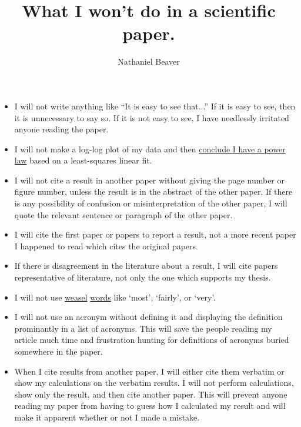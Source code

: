 \documentclass[12pt,letterpaper]{article}
\author{Nathaniel Beaver}
\title{What I won't do in a scientific paper.}
\begin{document}
\maketitle

\begin{itemize}
\item I will not write anything like ``It is easy to see that...'' If it is easy to see, then it is unnecessary to say so. If it is not easy to see, I have needlessly irritated anyone reading the paper.
\item I will not make a log-log plot of my data and then \href{http://vserver1.cscs.lsa.umich.edu/~crshalizi/notebooks/power-laws.html}{conclude I have a power law} based on a least-squares linear fit. 
\item I will not cite a result in another paper without giving the page number or figure number, unless the result is in the abstract of the other paper. If there is any possibility of confusion or misinterpretation of the other paper, I will quote the relevant sentence or paragraph of the other paper.
\item I will cite the first paper or papers to report a result, not a more recent paper I happened to read which cites the original papers.
\item If there is disagreement in the literature about a result, I will cite papers representative of literature, not only the one which supports my thesis.
\item I will not use \href{http://matt.might.net/articles/shell-scripts-for-passive-voice-weasel-words-duplicates/}{weasel} \href{http://en.wikipedia.org/wiki/Weasel_words}{words} like `most', `fairly', or `very'.
\item I will not use an acronym without defining it and displaying the definition prominantly in a list of acronyms. This will save the people reading my article much time and frustration hunting for definitions of acronyms buried somewhere in the paper.
\item When I cite results from another paper, I will either cite them verbatim or show my calculations on the verbatim results. I will not perform calculations, show only the result, and then cite another paper. This will prevent anyone reading my paper from having to guess how I calculated my result and will make it apparent whether or not I made a mistake.
\end{itemize}
\end{document}
